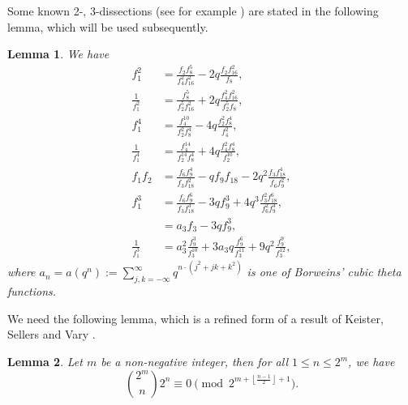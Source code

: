 \documentclass[12pt,reqno]{amsart}
\numberwithin{equation}{section}
\newtheorem{lemma}{Lemma}[section]
\begin{document}
Some known 2-, 3-dissections (see for example \cite[Lemmas 2, 3  and 4]{matching}) are stated in the following lemma, which will be used subsequently.
\begin{lemma}\label{lem-diss}
We have
\begin{align}
f_{1}^2 &= \frac{f_{2}f_{8}^5}{f_{4}^2f_{16}^2} - 2 q \frac{f_{2} f_{16}^2}{f_{8}},\label{disf1^2}\\
\frac{1}{f_{1}^2} &= \frac{f_{8}^5}{f_{2}^5 f_{16}^2} + 2 q \frac{f_{4}^2 f_{16}^2 }{f_{2}^5 f_{8}},\label{dis1byf1^2}\\
f_{1}^4 &= \frac{f_{4}^{10}}{f_{2}^2f_{8}^4} - 4 q \frac{f_{2}^2 f_{8}^4}{f_{4}^2},\label{disf1^4}\\
\frac{1}{f_{1}^4} &= \frac{f_{4}^{14}}{f_{2}^{14} f_{8}^4} + 4 q \frac{f_{4}^2 f_{8}^4}{f_{2}^{10}},\label{dis1byf1^4}\\
f_{1}f_{2} &= \frac{f_{6}f_{9}^4}{f_{3}f_{18}^2} - qf_{9}f_{18} - 2q^2 \frac{f_{3}f_{18}^4}{f_{6}f_{9}^2},\label{disf1f2}\\
f_{1}^3 &= \frac{f_{6}f_{9}^6}{f_{3}f_{18}^3}-3qf_{9}^3+4q^3 \frac{f_{3}^2f_{18}^6}{f_{6}^2f_{9}^3},\label{disf1^3}\\
&=a_3 f_3-3 qf_9^3,\label{3df1^3}\\
\frac{1}{f_1^3}&=a_3^2\frac{f_9^3}{f_3^{10}}+3 a_3 q \frac{f_9^6}{f_3^{11}}+9 q^2\frac{f_9^9}{f_3^{12}},\label{3d1/f1^3}
\end{align} where $a_n=a\left(q^n\right):=\displaystyle{\sum_{j,k=-\infty}^\infty q^{n\cdot (j^2+jk+k^2)}}$ is one of Borweins' cubic theta functions.
\end{lemma}

We need the following lemma, which is a refined form of a result of Keister, Sellers and Vary \cite[Lemma 7]{KeisterSellersVary}.
\begin{lemma}\label{lem1}
Let $m$ be a non-negative integer, then for all $1\leq n\leq 2^m$, we have
\[
\binom{2^m}{n}2^n\equiv 0 \pmod{2^{m+\left\lfloor\frac{n-1}{2}\right\rfloor+1}}.
\]
\end{lemma}
\end{document}
